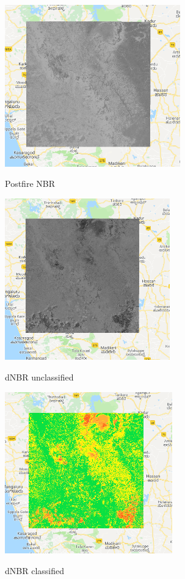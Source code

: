\documentclass[12pt]{svproc}
\begin{document}
\begin{figure}{}
	\includegraphics[width=0.6\linewidth, height=7cm]{postnbr.png} 
	\label{fig:subim1}
	\centering
	\caption{Postfire NBR}
\end{figure}

\begin{figure}{}
	\includegraphics[width=0.6\linewidth, height=7cm]{dnbrnonclass.png} 
	\label{fig:subim1}
	\centering
	\caption{dNBR unclassified}
\end{figure}

\begin{figure}{}
	\includegraphics[width=0.6\linewidth, height=7cm]{dnbrclass.png} 
	\label{fig:subim1}
	\centering
	\caption{dNBR classified}
\end{figure}
\end{document}
